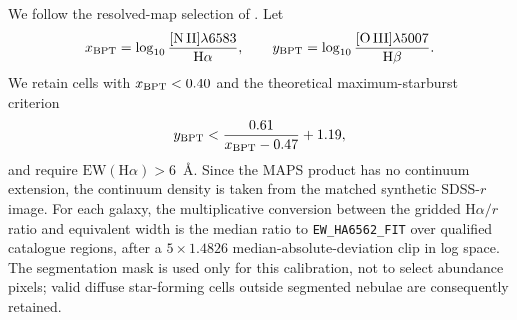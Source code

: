 \documentclass[fleqn,usenatbib]{mnras}
\begin{document}
We follow the resolved-map selection of \citet{Li2021}.  Let
\begin{equation}
    x_{\rm BPT}=\log_{10}\frac{[\mathrm{N\,II}]\lambda6583}{\mathrm{H}\alpha},
    \qquad
    y_{\rm BPT}=\log_{10}\frac{[\mathrm{O\,III}]\lambda5007}{\mathrm{H}\beta}.
\end{equation}
We retain cells with $x_{\rm BPT}<0.40$ and the theoretical maximum-starburst criterion \citep{Kewley2001}
\begin{equation}
    y_{\rm BPT}<\frac{0.61}{x_{\rm BPT}-0.47}+1.19,
\end{equation}
and require $\mathrm{EW}(\mathrm{H}\alpha)>6$~\AA.  Since the MAPS product has no continuum extension, the continuum density is taken from the matched synthetic SDSS-$r$ image.  For each galaxy, the multiplicative conversion between the gridded H$\alpha/r$ ratio and equivalent width is the median ratio to \texttt{EW\_HA6562\_FIT} over qualified catalogue regions, after a $5\times1.4826$ median-absolute-deviation clip in log space.  The segmentation mask is used only for this calibration, not to select abundance pixels; valid diffuse star-forming cells outside segmented nebulae are consequently retained.
\end{document}
